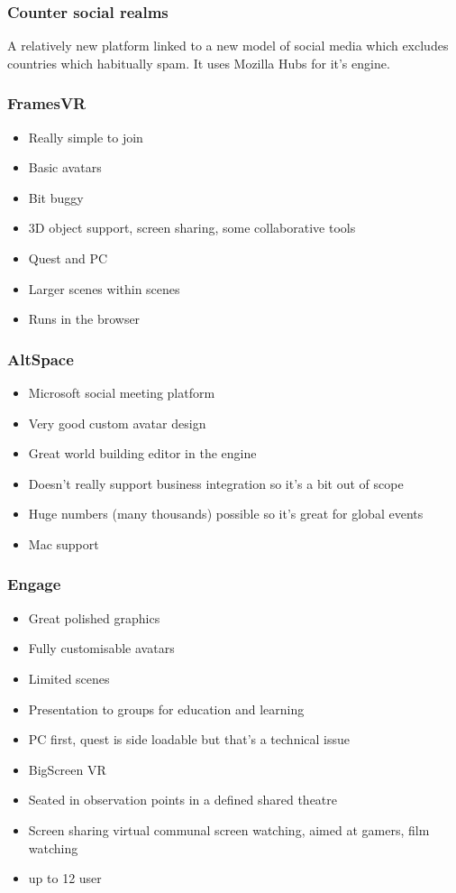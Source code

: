\subsubsection{Counter social realms}
A relatively new platform linked to a new model of social media which excludes countries which habitually spam. It uses Mozilla Hubs for it's engine.
\subsubsection{FramesVR}
\begin{itemize}
\item Really simple to join
\item Basic avatars
\item Bit buggy
\item 3D object support, screen sharing, some collaborative tools
\item Quest and PC
\item Larger scenes within scenes
\item Runs in the browser
\end{itemize}
\subsubsection{AltSpace}
\begin{itemize}
\item Microsoft social meeting platform
\item Very good custom avatar design
\item Great world building editor in the engine
\item Doesn't really support business integration so it's a bit out of scope
\item Huge numbers (many thousands) possible so it's great for global events
\item Mac support
\end{itemize}
\subsubsection{Engage}
\begin{itemize}
\item Great polished graphics
\item Fully customisable avatars
\item Limited scenes
\item Presentation to groups for education and learning
\item PC first, quest is side loadable but that's a technical issue
\item BigScreen VR
\item Seated in observation points in a defined shared theatre
\item Screen sharing virtual communal screen watching, aimed at gamers, film watching
\item up to 12 user
\end{itemize}
